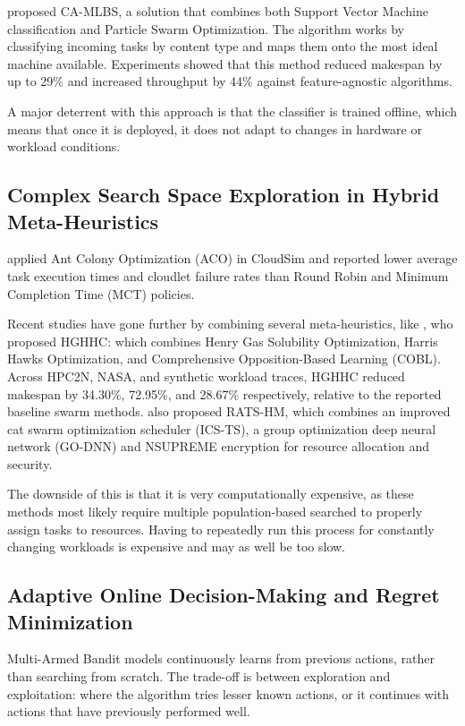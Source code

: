 \citet{Adil2022scp} proposed CA-MLBS, a solution that combines both Support Vector Machine classification and Particle Swarm Optimization. The algorithm works by classifying incoming tasks by content type and maps them onto the most ideal machine available. Experiments showed that this method reduced makespan by up to 29\% and increased throughput by 44\% against feature-agnostic algorithms.

A major deterrent with this approach is that the classifier is trained offline, which means that once it is deployed, it does not adapt to changes in hardware or workload conditions.

\subsection{Complex Search Space Exploration in Hybrid Meta-Heuristics}

\citet{Kumar2021Implementation} applied Ant Colony Optimization (ACO) in CloudSim and reported lower average task execution times and cloudlet failure rates than Round Robin and Minimum Completion Time (MCT) policies.

Recent studies have gone further by combining several meta-heuristics, like \citet{Alkaam2025Hybrid}, who proposed HGHHC: which combines Henry Gas Solubility Optimization, Harris Hawks Optimization, and Comprehensive Opposition-Based Learning (COBL). Across HPC2N, NASA, and synthetic workload traces, HGHHC reduced makespan by 34.30\%, 72.95\%, and 28.67\% respectively, relative to the reported baseline swarm methods. \citet{Bal2022A} also proposed RATS-HM, which combines an improved cat swarm optimization scheduler (ICS-TS), a group optimization deep neural network (GO-DNN) and NSUPREME encryption for resource allocation and security.

The downside of this is that it is very computationally expensive, as these methods most likely require multiple population-based searched to properly assign tasks to resources. Having to repeatedly run this process for constantly changing workloads is expensive and may as well be too slow.

\subsection{Adaptive Online Decision-Making and Regret Minimization}

Multi-Armed Bandit models continuously learns from previous actions, rather than searching from scratch. The trade-off is between exploration and exploitation: where the algorithm tries lesser known actions, or it continues with actions that have previously performed well.

